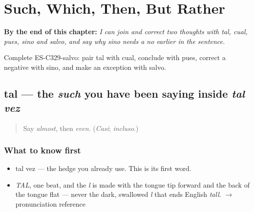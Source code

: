 
\chapter{Such, Which, Then, But Rather}
\label{ch:tal-y-salvo}

\begin{chapteropening}
\textbf{By the end of this chapter:} \emph{I can join and correct two thoughts with tal, cual, pues, sino and salvo, and say why sino needs a no earlier in the sentence.}

Complete ES-C329-salvo: pair tal with cual, conclude with pues, correct a negative with sino, and make an exception with salvo.
\end{chapteropening}

\section[tal]{tal — the \emph{such} you have been saying inside \emph{tal vez}}

\label{lesson:ES-C329-tal}



\begin{quote}
Say \emph{almost}, then \emph{even}. (\emph{Casi}; \emph{incluso}.)
\end{quote}

\subsection*{What to know first}
\begin{itemize}
\raggedright
  \item tal vez — the hedge you already use. This is its first word.
\end{itemize}

\begin{sounds}
\begin{itemize}
\raggedright
  \item \emph{TAL}, one beat, and the \emph{l} is made with the tongue tip forward and the back of the tongue flat — never the dark, swallowed \emph{l} that ends English \emph{tall}. $\to$ pronunciation reference
\end{itemize}
\end{sounds}

